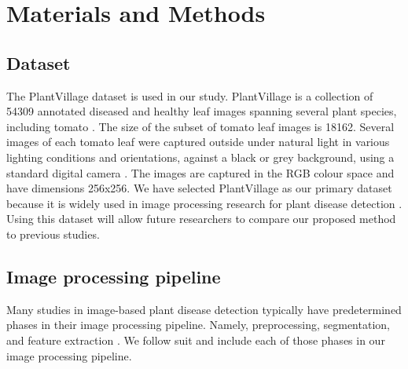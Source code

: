 \chapter{Materials and Methods}

\section{Dataset}
The PlantVillage dataset is used in our study. PlantVillage is a collection of 54309 annotated diseased and healthy leaf images spanning several plant species, including tomato \cite{hughesOpenAccessRepository2016}. The size of the subset of tomato leaf images is 18162. Several images of each tomato leaf were captured outside under natural light in various lighting conditions and orientations, against a black or grey background, using a standard digital camera \cite{hughesOpenAccessRepository2016, kiranPlantLeafDisease2023}. The images are captured in the RGB colour space and have dimensions 256x256. We have selected PlantVillage as our primary dataset because it is widely used in image processing research for plant disease detection \cite{liReviewComputerVision2020, jiangConvolutionalNeuralNetworks2020, jafarRevolutionizingAgricultureArtificial2024, g.IdentificationPlantLeaf2019, francisDiseaseDetectionClassification2019, govardhanDiagnosisTomatoPlant2019}. Using this dataset will allow future researchers to compare our proposed method to previous studies.

\section{Image processing pipeline}
Many studies in image-based plant disease detection typically have predetermined phases in their image processing pipeline. Namely, preprocessing, segmentation, and feature extraction \cite{jafarRevolutionizingAgricultureArtificial2024, kaurPlantsDiseaseIdentification2019, perez-sanzPlantPhenomicsOverview2017, alhiaryFastAccurateDetection2011, desaiEnhancingImageQuality2025}. We follow suit and include each of those phases in our image processing pipeline.

